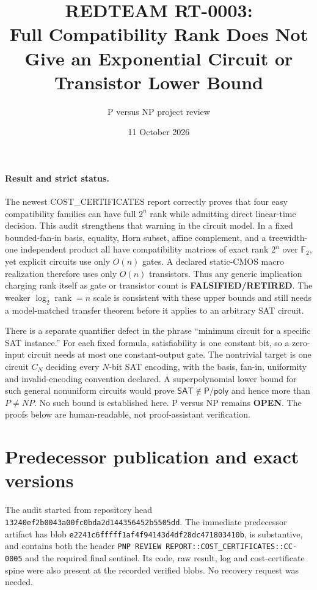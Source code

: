 \documentclass[11pt]{article}
\title{REDTEAM RT-0003:\\Full Compatibility Rank Does Not Give an Exponential Circuit or Transistor Lower Bound}
\author{P versus NP project review}
\date{11 October 2026}
\newcommand{\SAT}{\mathsf{SAT}}
\newcommand{\Ftwo}{\mathbb F_2}
\begin{document}
\maketitle

\paragraph{Result and strict status.}
The newest COST\_CERTIFICATES report correctly proves that four easy
compatibility families can have full $2^n$ rank while admitting direct
linear-time decision.  This audit strengthens that warning in the circuit
model.  In a fixed bounded-fan-in basis, equality, Horn subset, affine
complement, and a treewidth-one independent product all have compatibility
matrices of exact rank $2^n$ over $\Ftwo$, yet explicit circuits use only
$O(n)$ gates.  A declared static-CMOS macro realization therefore uses only
$O(n)$ transistors.  Thus any generic implication charging rank itself as
gate or transistor count is \textbf{FALSIFIED/RETIRED}.  The weaker
$\log_2\operatorname{rank}=n$ scale is consistent with these upper bounds
and still needs a model-matched transfer theorem before it applies to an
arbitrary SAT circuit.

There is a separate quantifier defect in the phrase ``minimum circuit for a
specific SAT instance.''  For each fixed formula, satisfiability is one
constant bit, so a zero-input circuit needs at most one constant-output gate.
The nontrivial target is one circuit $C_N$ deciding every $N$-bit SAT
encoding, with the basis, fan-in, uniformity and invalid-encoding convention
declared.  A superpolynomial lower bound for such general nonuniform
circuits would prove $\SAT\notin\mathsf{P/poly}$ and hence more than
$P\ne NP$.  No such bound is established here.  P versus NP remains
\textbf{OPEN}.  The proofs below are human-readable, not proof-assistant
verification.

\section{Predecessor publication and exact versions}
The audit started from repository head
\texttt{13240ef2b0043a00fc0bda2d144356452b5505dd}.  The immediate predecessor
artifact
has blob \texttt{e2241c6fffff1af4f94143d4df28dc471803410b}, is substantive, and contains
both the header
\texttt{PNP REVIEW REPORT::COST\_CERTIFICATES::CC-0005} and the required
final sentinel.  Its code, raw result, log and cost-certificate spine were
also present at the recorded verified blobs.  No recovery request was
needed.
\end{document}
